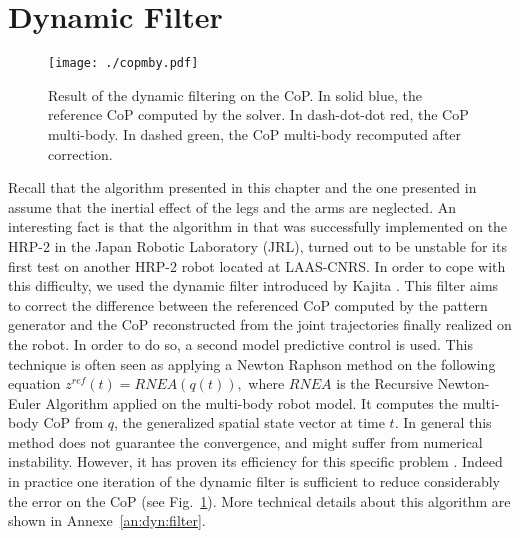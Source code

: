 \section{Dynamic Filter}
\label{Sec:dynamic_filter}
%

\begin{figure}[h]
  \begin{center}  
    \texttt{[image: ./copmby.pdf]}
    \caption[CoP filtered]{
      Result of the dynamic filtering on the CoP.
      In solid blue, the reference CoP computed by the solver.
      In dash-dot-dot red, the CoP multi-body.
      In dashed green, the CoP multi-body recomputed after correction.
    	}
    \label{fig:resultDynamicFilter}
  \end{center}
\end{figure}

Recall that the algorithm presented in this chapter and the one presented in \cite{herdt:iros:2010} assume that the inertial effect of the legs and the arms are neglected.
An interesting fact is that the algorithm in \cite{herdt:iros:2010} that was successfully implemented on the \mbox{HRP-2} in the Japan Robotic Laboratory (JRL),
turned out to be unstable for its first test on another \mbox{HRP-2} robot located at LAAS-CNRS.
In order to cope with this difficulty, we used the dynamic filter introduced by Kajita \cite{Kajita:icra:2003}.
This filter aims to correct the difference between the referenced CoP computed by the pattern generator and the CoP reconstructed from 
the joint trajectories finally realized on the robot.
In order to do so, a second model predictive control is used.
This technique is often seen as applying a Newton Raphson method on the following equation
$ z^{ref}(t) = RNEA(q (t)),$
where $RNEA$ is the Recursive Newton-Euler Algorithm applied on the multi-body robot model. 
It computes the multi-body CoP from
$q$, the generalized spatial state vector at time $t$.
In general this method does not guarantee the convergence, and might suffer from numerical instability.
However, it has proven its efficiency for this specific problem \cite{Nishiwaki2007}.
Indeed in practice one iteration of the dynamic filter is sufficient to reduce considerably the error on the CoP (see Fig.~\ref{fig:resultDynamicFilter}).
More technical details about this algorithm are shown in Annexe~\ref{an:dyn:filter}.

